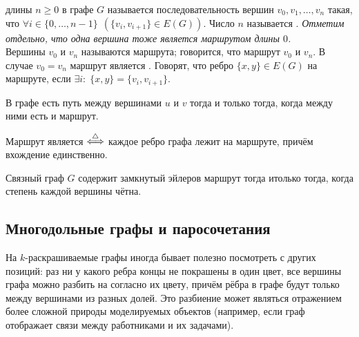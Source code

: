 \begin{definition}
     длины $ n \geqslant 0 $ в графе $ G $ называется последовательность вершин $ v_0, v_1, \ldots, v_n $ такая,
    что $ \forall i \in \{ 0, \ldots, n-1 \} \;\, \left( \{v_i, v_{i+1}\} \in E(G) \right) $.
    \newline
    Число $ n $ называется .
    \newline
    \textit{Отметим отдельно, что одна вершина тоже является маршрутом длины $ 0 $.}
    \\[0.25\baselineskip]
    Вершины $ v_0 $ и $ v_n $ называются  маршрута;
    говорится, что маршрут  $ v_0 $ и $ v_n $.
    В случае $ v_0 = v_n $ маршрут является .
    \newline
    Говорят, что ребро $ \{x, y\} \in E(G) $  на маршруте, если $ \exists i: \; \{x, y\} = \{v_i, v_{i+1}\} $.
\end{definition}

\begin{statement}
    \label{statement:graphs:path_walk_equivalency}
    В графе есть путь между вершинами $ u $ и $ v $ тогда и только тогда, когда между ними есть и маршрут.
\end{statement}

\begin{definition}
    Маршрут является  $ \overset{\triangle}{\Longleftrightarrow} $ каждое ребро графа лежит на маршруте, причём вхождение единственно.
\end{definition}

\begin{theorem}
    Связный граф $ G $ содержит замкнутый эйлеров маршрут тогда итолько тогда, когда степень каждой вершины чётна.
\end{theorem}



\subsection{Многодольные графы и паросочетания}
\label{subsec:graphs:multipartite_matching}

На $ k $-раскрашиваемые графы иногда бывает полезно посмотреть с других позиций:
раз ни у какого ребра концы не покрашены в один цвет, все вершины графа можно разбить на  согласно их цвету,
причём рёбра в графе будут только между вершинами из разных долей.
Это разбиение может являться отражением более сложной природы моделируемых объектов
(например, если граф отображает связи между работниками и их задачами).

